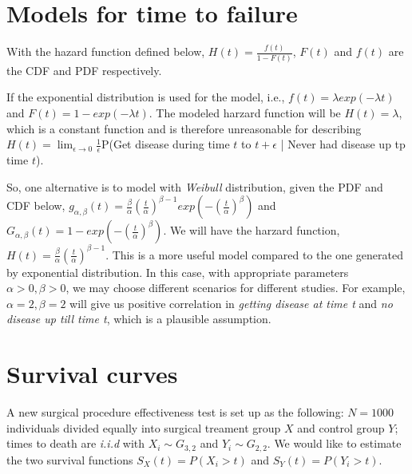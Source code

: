 \documentclass{article}
\begin{document}
\section*{Models for time to failure}

\hspace{12 pt} With the hazard function defined below, \newline
$\displaystyle H(t) = \frac{f(t)}{1-F(t)}$, \newline
$F(t)$ and $f(t)$ are the CDF and PDF respectively. 

\vspace{6 pt}
If the exponential distribution is used for the model, i.e., \newline
$f(t) = \lambda exp(-\lambda t)$ and $F(t) = 1 - exp(-\lambda t)$.\newline
The modeled harzard function will be \newline
$H(t) = \lambda$, \newline
which is a constant function and is therefore unreasonable for
describing \newline
$H(t) = \lim_{\epsilon \to 0} \frac{1}{\epsilon}$P(Get disease during
time $t$ to $t+\epsilon$ | Never had disease up tp time $t$).

\vspace{6 pt}
So, one alternative is to model with \textit{Weibull} distribution,
given the PDF and CDF below,\newline
$\displaystyle g_{\alpha ,\beta}(t)=\frac{\beta}{\alpha}(\frac{t}{\alpha})^{\beta-1}exp(-(\frac{t}{\alpha})^{\beta})$ and
$\displaystyle G_{\alpha ,\beta}(t)=1 - exp(-(\frac{t}{\alpha})^{\beta})$. \newline
We will have the harzard function, \newline
$\displaystyle H(t)=\frac{\beta}{\alpha}(\frac{t}{\alpha})^{\beta-1}$. \newline
This is a more useful model compared to the one generated by
exponential distribution. In this case, with appropriate parameters
$\alpha > 0, \beta > 0$, we may choose different scenarios for
different studies. For example, $\alpha=2, \beta=2$ will give us
positive correlation in \textit{getting disease at time t} and
\textit{no disease up till time t}, which is a plausible assumption.



\newpage
\section*{Survival curves}
\hspace{12 pt} A new surgical procedure effectiveness test is set up
as the following: \newline
$N = 1000$ individuals divided equally into
surgical treament group $X$ and control group $Y$; \newline
times to death are \textit{i.i.d} with $X_i \sim G_{3,2}$ and $Y_i\sim G_{2,2}$. \newline  
We would like to estimate the two survival functions
$S_X(t) = P(X_i > t)$ and $S_Y(t) = P(Y_i > t)$.
\end{document}
